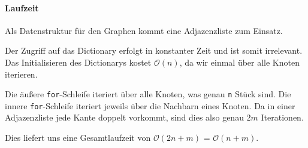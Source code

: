 \documentclass[12pt]{scrartcl}%
\theoremstyle{nonumberplain}
\newcommand{\bO}[1]{\mathcal O(#1)}
\newcommand{\code}[1]{\lstinline[basicstyle=\ttfamily\color{black}]{#1}}
\begin{document}
\paragraph{Laufzeit}
Als Datenstruktur für den Graphen kommt eine Adjazenzliste zum Einsatz.

Der Zugriff auf das Dictionary erfolgt in konstanter Zeit und ist somit irrelevant.
Das Initialisieren des Dictionarys kostet $\bO{n}$, da wir einmal über alle Knoten iterieren.

Die äußere \code{for}-Schleife iteriert über alle Knoten, was genau \code{n} Stück sind. Die innere \code{for}-Schleife iteriert jeweils über die Nachbarn eines Knoten. Da in einer Adjazenzliste jede Kante doppelt vorkommt, sind dies also genau $2m$ Iterationen.

Dies liefert uns eine Gesamtlaufzeit von $\bO{2n + m}$ = $\bO{n + m}$.
\end{document}
